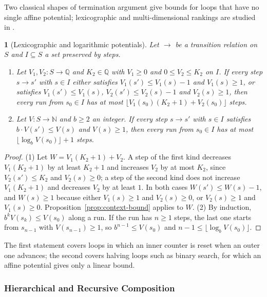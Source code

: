 \documentclass[oneside,english]{amsart}
\numberwithin{equation}{section}
\numberwithin{figure}{section}
\theoremstyle{plain}
\theoremstyle{definition}
\theoremstyle{plain}
\newtheorem{prop}[thm]{\protect\propositionname}
\theoremstyle{remark}
\theoremstyle{plain}
\theoremstyle{definition}
\theoremstyle{plain}
\theoremstyle{remark}
\providecommand{\propositionname}{Proposition}
\begin{document}
Two classical shapes of termination argument give bounds for loops that have no single affine potential; lexicographic and multi-dimensional rankings are studied in \cite{alias2010multi,benamram2014ranking}.

\begin{prop}[Lexicographic and logarithmic potentials]
\label{prop:lex-log}
Let $\to$ be a transition relation on $S$ and $I \subseteq S$ a set preserved by steps.
\begin{enumerate}
    \item Let $V_1, V_2 : S \to \mathbb{Q}$ and $K_2 \in \mathbb{Q}$ with $V_1 \ge 0$ and $0 \le V_2 \le K_2$ on $I$. If every step $s \to s'$ with $s \in I$ either satisfies $V_1(s') \le V_1(s) - 1$ and $V_1(s) \ge 1$, or satisfies $V_1(s') \le V_1(s)$, $V_2(s') \le V_2(s) - 1$ and $V_2(s) \ge 1$, then every run from $s_0 \in I$ has at most $\lfloor V_1(s_0) (K_2 + 1) + V_2(s_0) \rfloor$ steps.
    \item Let $V : S \to \mathbb{N}$ and $b \ge 2$ an integer. If every step $s \to s'$ with $s \in I$ satisfies $b \cdot V(s') \le V(s)$ and $V(s) \ge 1$, then every run from $s_0 \in I$ has at most $\lfloor \log_b V(s_0) \rfloor + 1$ steps.
\end{enumerate}
\end{prop}

\begin{proof}
(1) Let $W = V_1 (K_2 + 1) + V_2$. A step of the first kind decreases $V_1 (K_2 + 1)$ by at least $K_2 + 1$ and increases $V_2$ by at most $K_2$, since $V_2(s') \le K_2$ and $V_2(s) \ge 0$; a step of the second kind does not increase $V_1 (K_2 + 1)$ and decreases $V_2$ by at least $1$. In both cases $W(s') \le W(s) - 1$, and $W(s) \ge 1$ because either $V_1(s) \ge 1$ and $V_2(s) \ge 0$, or $V_2(s) \ge 1$ and $V_1(s) \ge 0$. Proposition~\ref{prop:context-bound} applies to $W$. (2) By induction, $b^k V(s_k) \le V(s_0)$ along a run. If the run has $n \ge 1$ steps, the last one starts from $s_{n-1}$ with $V(s_{n-1}) \ge 1$, so $b^{n-1} \le V(s_0)$ and $n - 1 \le \lfloor \log_b V(s_0) \rfloor$.
\end{proof}

The first statement covers loops in which an inner counter is reset when an outer one advances; the second covers halving loops such as binary search, for which an affine potential gives only a linear bound.

\subsubsection{Hierarchical and Recursive Composition}
\label{subsubsec:compositional-wcet}
\end{document}
